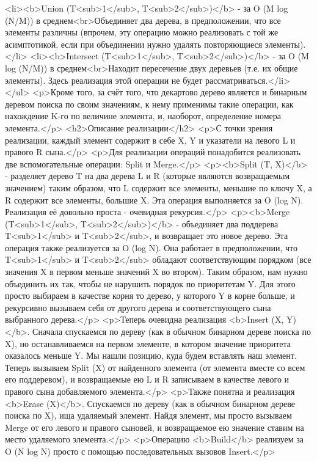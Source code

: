 <li><b>Union (T<sub>1</sub>, T<sub>2</sub>)</b> - за O (M log (N/M)) в среднем<br>Объединяет два дерева, в предположении, что все элементы различны (впрочем, эту операцию можно реализовать с той же асимптотикой, если при объединении нужно удалять повторяющиеся элементы).</li>
<li><b>Intersect (T<sub>1</sub>, T<sub>2</sub>)</b> - за O (M log (N/M)) в среднем<br>Находит пересечение двух деревьев (т.е. их общие элементы). Здесь реализация этой операции не будет рассматриваться.</li>
</ul>
<p>Кроме того, за счёт того, что декартово дерево является и бинарным деревом поиска по своим значениям, к нему применимы такие операции, как нахождение K-го по величине элемента, и, наоборот, определение номера элемента.</p>
<h2>Описание реализации</h2>
<p>С точки зрения реализации, каждый элемент содержит в себе X, Y и указатели на левого L и правого R сына.</p>
<p>Для реализации операций понадобится реализовать две вспомогательные операции: Split и Merge.</p>
<p><b>Split (T, X)</b> - разделяет дерево T на два дерева L и R (которые являются возвращаемым значением) таким образом, что L содержит все элементы, меньшие по ключу X, а R содержит все элементы, большие X. Эта операция выполняется за O (log N). Реализация её довольно проста - очевидная рекурсия.</p>
<p><b>Merge (T<sub>1</sub>, T<sub>2</sub>)</b> - объединяет два поддерева T<sub>1</sub> и T<sub>2</sub>, и возвращает это новое дерево. Эта операция также реализуется за O (log N). Она работает в предположении, что T<sub>1</sub> и T<sub>2</sub> обладают соответствующим порядком (все значения X в первом меньше значений X во втором). Таким образом, нам нужно объединить их так, чтобы не нарушить порядок по приоритетам Y. Для этого просто выбираем в качестве корня то дерево, у которого Y в корне больше, и рекурсивно вызываем себя от другого дерева и соответствующего сына выбранного дерева.</p>
<p>Теперь очевидна реализация <b>Insert (X, Y)</b>. Сначала спускаемся по дереву (как в обычном бинарном дереве поиска по X), но останавливаемся на первом элементе, в котором значение приоритета оказалось меньше Y. Мы нашли позицию, куда будем вставлять наш элемент. Теперь вызываем Split (X) от найденного элемента (от элемента вместе со всем его поддеревом), и возвращаемые ею L и R записываем в качестве левого и правого сына добавляемого элемента.</p>
<p>Также понятна и реализация <b>Erase (X)</b>. Спускаемся по дереву (как в обычном бинарном дереве поиска по X), ища удаляемый элемент. Найдя элемент, мы просто вызываем Merge от его левого и правого сыновей, и возвращаемое ею значение ставим на место удаляемого элемента.</p>
<p>Операцию <b>Build</b> реализуем за O (N log N) просто с помощью последовательных вызовов Insert.</p>
